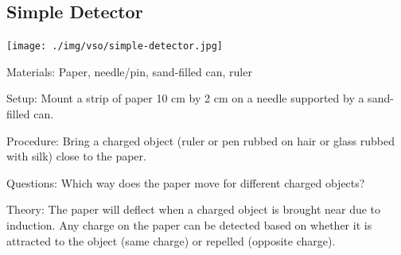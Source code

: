\begin{multicols}{2}

%
%

\subsection{Simple Detector}

\begin{center}
\texttt{[image: ./img/vso/simple-detector.jpg]}
\end{center}

\begin{description*}
\item[Materials:]{Paper, needle/pin, sand-filled can, ruler}
\item[Setup:]{Mount a strip of paper 10 cm by 2 cm on a needle supported by a sand-filled can.}
\item[Procedure:]{Bring a charged object (ruler or pen rubbed on hair or glass rubbed with silk) close to the paper.}
\item[Questions:]{Which way does the paper move for different charged objects?}
\item[Theory:]{The paper will deflect when a charged object is brought near due to induction. Any charge on the paper can be detected based on whether it is attracted to the object (same charge) or repelled (opposite charge).}
\end{description*}


\end{multicols}
